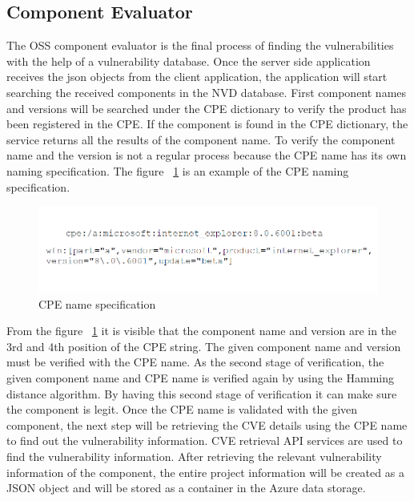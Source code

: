 \subsection{Component Evaluator}
The \acs{OSS} component evaluator is the final process of finding the vulnerabilities with the help of a vulnerability database. Once the server side application receives the json objects from the client application, the application will start searching the received components in the \acs{NVD} database. First component names and versions will be searched under the \acs{CPE} dictionary to verify the product has been registered in the \acs{CPE}. If the component is found in the \acs{CPE} dictionary, the service returns all the results of the component name. To verify the component name and the version is not a regular process because the \acs{CPE} name has its own naming specification. The figure ~\ref{fig:cpe_name} is an example of the \acs{CPE} naming specification.
 \begin{figure}[h!]
	\includegraphics[width=15cm]{includes/cpe_name.png}
	\centering
	\caption{CPE name specification}
	\label{fig:cpe_name}
\end{figure}
From the figure ~\ref{fig:cpe_name} it is visible that the component name and version are in the 3rd and 4th position of the \acs{CPE} string. The given component name and version must be verified with the \acs{CPE} name. As the second stage of verification, the given component name and \acs{CPE} name is verified again by using the Hamming distance algorithm. By having this second stage of verification it can make sure the component is legit. Once the \acs{CPE} name is validated with the given component, the next step will be retrieving the \acs{CVE} details using the \acs{CPE} name to find out the vulnerability information. \acs{CVE} retrieval API services are used to find the vulnerability information. After retrieving the relevant vulnerability information of the component, the entire project information will be created as a \acs{JSON} object and will be stored as a container in the Azure data storage.
\newpage 
